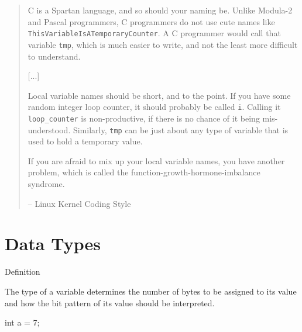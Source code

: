 \documentclass[compress]{beamer}
\begin{document}
\begin{slide}
	\begin{quotation} \scriptsize \normalfont

	C is a Spartan language, and so should your naming be.
	Unlike Modula-2 and Pascal programmers, C programmers do not use cute names like \alert{\texttt{ThisVariableIsATemporaryCounter}}.
	A C programmer would call that variable \alert{\texttt{tmp}}, which is much easier to write, and not the least more difficult to understand.
	
	[...]
	
	Local variable names should be short, and to the point.
	If you have some random integer loop counter, it should probably be called \alert{\texttt{i}}.
	Calling it \alert{\texttt{loop\_counter}} is non-productive, if there is no chance of it being mis-understood.
	Similarly, \alert{\texttt{tmp}} can be just about any type of variable that is used to hold a temporary value.
	
	If you are afraid to mix up your local variable names, you have another problem, which is called the function-growth-hormone-imbalance syndrome.

	\begin{flushright}-- Linux Kernel Coding Style\end{flushright}

	\end{quotation}
\end{slide}

\section{Data Types}

\begin{slide}
	\begin{block}{Definition}

	The type of a variable determines the number of bytes to be assigned to its value and how the bit pattern of its value should be interpreted.

	\begin{terminal}
	int a = 7;
	\end{terminal}

	\end{block}
\end{slide}
\end{document}
